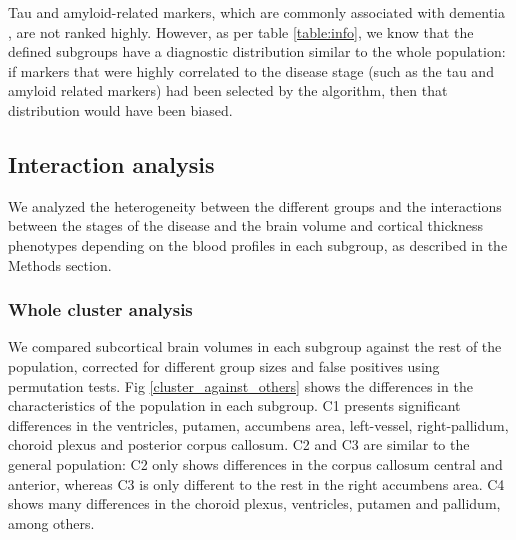 Tau and amyloid-related markers, which are commonly associated with dementia \cite{Dage2016,Ovod2017,Nakamura2018}, are not ranked highly. However, as per table \ref{table:info}, we know that the defined subgroups have a diagnostic distribution similar to the whole population: if markers that were highly correlated to the disease stage (such as the tau and amyloid related markers) had been selected by the algorithm, then that distribution would have been biased. \\

\subsection{Interaction analysis}

We analyzed the heterogeneity between the different groups and the interactions between the stages of the disease and the brain volume and cortical thickness phenotypes depending on the blood profiles in each subgroup, as described in the Methods section. \\

\subsubsection{Whole cluster analysis}

We compared subcortical brain volumes in each subgroup against the rest of the population, corrected for different group sizes and false positives using permutation tests. Fig \ref{cluster_against_others} shows the differences in the characteristics of the population in each subgroup. C1 presents significant differences in the ventricles, putamen, accumbens area, left-vessel, right-pallidum, choroid plexus and posterior corpus callosum. C2 and C3 are similar to the general population: C2 only shows differences in the corpus callosum central and anterior, whereas C3 is only different to the rest in the right accumbens area. C4 shows many differences in the choroid plexus, ventricles, putamen and pallidum, among others.

